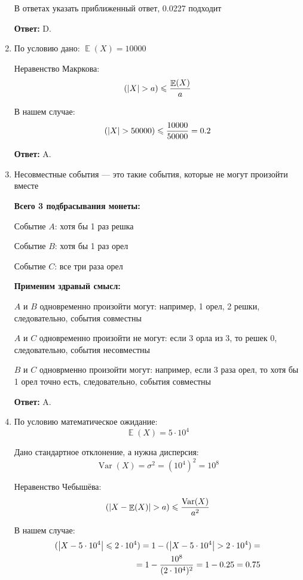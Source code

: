 \documentclass[a4paper]{article} %
\DeclareMathOperator{\Var}{Var}
\DeclareMathOperator{\E}{\mathbb{E}}
\let\P\relax
\DeclareMathOperator{\P}{\mathbb{P}}
\renewcommand{\leq}{\leqslant}
\begin{document}
\begin{enumerate}
    В ответах указать приближенный ответ, 0.0227 подходит
    
    \textbf{Ответ:} D.
    
    
    \item
    По условию дано: $\E(X) = 10000$
    
    Неравенство Макркова:
    \[
    \P(\abs{X} > a) \leq \frac{\E(X)}{a}
    \]
    
    В нашем случае:
    \[
    \P(\abs{X} > 50000) \leq \frac{10000}{50000} = 0.2
    \]
    
    \textbf{Ответ:} A.
    
    
    \item
    Несовместные события — это такие события, которые не могут произойти вместе
    
    \textbf{Всего 3 подбрасывания монеты:}
    
    Событие $A$: хотя бы 1 раз решка

    Событие $B$: хотя бы 1 раз орел

    Событие $C$: все три раза орел
    
    \textbf{Применим здравый смысл:}
    
    $A$ и $B$ одновременно произойти могут: например, 1 орел, 2 решки, следовательно, события совместны
    
    $A$ и $C$ одновременно произойти не могут: если 3 орла из 3, то решек 0, следовательно, события несовместны
    
    $B$ и $C$ одноврменно произойти могут: например, если 3 раза орел, то хотя бы 1 орел точно есть, следовательно, события совместны
    
    \textbf{Ответ:} A.
    
    
    \item
    По условию математическое ожидание:
    \[
    \E(X) = 5\cdot10^4
    \]
    
    Дано стандартное отклонение, а нужна дисперсия:
    \[
    \Var(X) = \sigma^2 = (10^4)^2 = 10^8
    \]
    
    Неравенство Чебышёва:
    \[
    \P(\abs{X - \E(X)} > a) \leq \frac{\Var(X)}{a^2}
    \]
    
    В нашем случае:
    \begin{align*}
    \P(\abs{X- 5\cdot10^4} \leq 2\cdot10^4) = 1 - \P(\abs{X- 5\cdot10^4} > 2\cdot10^4) = \\
    =1 - \frac{10^8}{(2 \cdot 10^4)^2} = 1 - 0.25 = 0.75
    \end{align*}
    

\end{enumerate}
\end{document}
